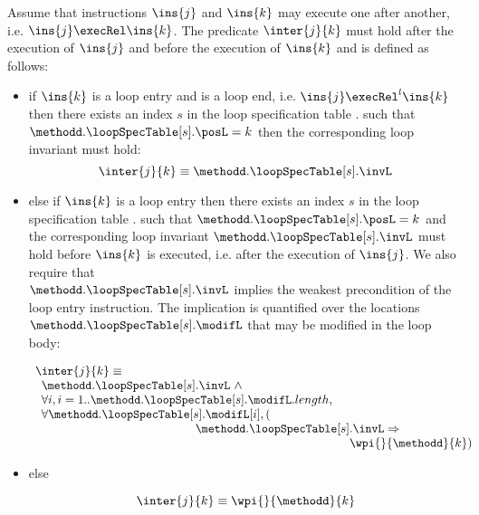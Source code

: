 \begin{defInter}\label{inter} 
Assume that instructions $\ins{j} $ and $\ins{k}$ may execute one after another, i.e. $\ins{j} \execRel \ins{k}$. 
The predicate $\inter{j}{k}$ must hold after the execution of $\ins{j}$ and before the execution of 
$\ins{k}$ and is defined as follows:
\begin{itemize}
\item if $\ins{k}$ is a loop entry and   is a loop end, i.e. $\ins{j} \execRel^l \ins{k}$ then there exists
an index $s$ in the loop specification table  \methodd.\loopSpecTable{} such that  $ \methodd.\loopSpecTable[s].\posL = k $
then the corresponding loop invariant  must hold:
$$
\inter{j}{k} \equiv  \methodd.\loopSpecTable[s].\invL
$$


\item else if $\ins{k}$  is a loop entry then there exists
an index $s$ in the loop specification table  \methodd.\loopSpecTable{} such that $ \methodd.\loopSpecTable[s].\posL = k $ 
and the corresponding loop invariant $ \methodd.\loopSpecTable[s].\invL$  must hold before $\ins{k}$ is executed, 
i.e. after the execution of $\ins{j}$. We also require that \\
$\methodd.\loopSpecTable[s].\invL$ implies the weakest precondition of the loop entry instruction. 
The implication is quantified over the locations $ \methodd.\loopSpecTable[s].\modifL $ that may be modified in the loop body:

$$\begin{array}{l} \inter{j}{k} \equiv \\ \begin{array}{l}
          \methodd.\loopSpecTable[s].\invL \ \wedge \\
          \forall i , i = 1.. \methodd.\loopSpecTable[s].\modifL.length ,\\
          \forall  \methodd.\loopSpecTable[s].\modifL[i], (\\
	  \phantom{ \methodd.\loopSpecTable[s] }  \methodd.\loopSpecTable[s].\invL \Rightarrow \\
	  \phantom{ \methodd.\loopSpecTable[s]  \methodd.\loopSpecTable[s] } \wpi{ }{ \methodd }{k} ) 
 \end{array}
 \end{array}  $$

\item else 

$$\inter{j}{k} \equiv \wpi{ }{\methodd}{k}$$
\end{itemize}
\end{defInter}
